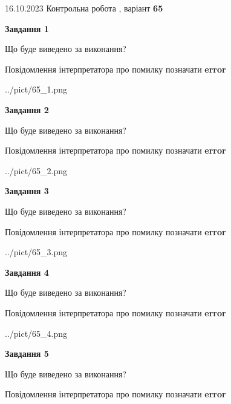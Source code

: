\documentclass[12pt, ukrainian]{article}
\begin{document}
{\Large{16.10.2023 Контрольна робота , варіант  \No \textbf { 65 }\par}}
{
\begin {large}
{\begin {center}\textbf{Завдання 1}\end {center}}\par
Що буде виведено за виконання? \par
Повідомлення інтерпретатора про помилку позначати \textbf{error}

\begin{center}
	{../pict/65_1.png}
\end{center}
\newpage

{\begin {center}\textbf{Завдання 2}\end {center}}\par
Що буде виведено за виконання? \par
Повідомлення інтерпретатора про помилку позначати \textbf{error}

\begin{center}
	{../pict/65_2.png}
\end{center}
\newpage

{\begin {center}\textbf{Завдання 3}\end {center}}\par
Що буде виведено за виконання? \par
Повідомлення інтерпретатора про помилку позначати \textbf{error}

\begin{center}
	{../pict/65_3.png}
\end{center}
\newpage

{\begin {center}\textbf{Завдання 4}\end {center}}\par
Що буде виведено за виконання? \par
Повідомлення інтерпретатора про помилку позначати \textbf{error}

\begin{center}
	{../pict/65_4.png}
\end{center}
\newpage

{\begin {center}\textbf{Завдання 5}\end {center}}\par
Що буде виведено за виконання? \par
Повідомлення інтерпретатора про помилку позначати \textbf{error}


\end{large}}
\end{document}
